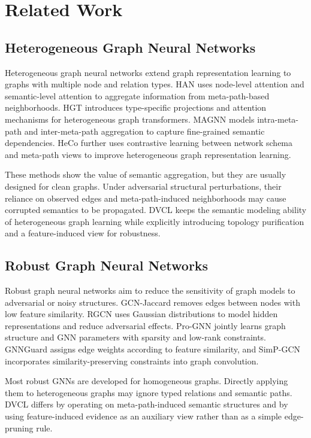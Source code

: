 ﻿\section{Related Work}

\subsection{Heterogeneous Graph Neural Networks}

Heterogeneous graph neural networks extend graph representation learning to graphs with multiple node and relation types. HAN \cite{wang2019han} uses node-level attention and semantic-level attention to aggregate information from meta-path-based neighborhoods. HGT \cite{hu2020hgt} introduces type-specific projections and attention mechanisms for heterogeneous graph transformers. MAGNN \cite{fu2020magnn} models intra-meta-path and inter-meta-path aggregation to capture fine-grained semantic dependencies. HeCo \cite{wang2021heco} further uses contrastive learning between network schema and meta-path views to improve heterogeneous graph representation learning.

These methods show the value of semantic aggregation, but they are usually designed for clean graphs. Under adversarial structural perturbations, their reliance on observed edges and meta-path-induced neighborhoods may cause corrupted semantics to be propagated. DVCL keeps the semantic modeling ability of heterogeneous graph learning while explicitly introducing topology purification and a feature-induced view for robustness.

\subsection{Robust Graph Neural Networks}

Robust graph neural networks aim to reduce the sensitivity of graph models to adversarial or noisy structures. GCN-Jaccard \cite{wu2019gcnjaccard} removes edges between nodes with low feature similarity. RGCN \cite{zhu2019rgcn} uses Gaussian distributions to model hidden representations and reduce adversarial effects. Pro-GNN \cite{jin2020prognn} jointly learns graph structure and GNN parameters with sparsity and low-rank constraints. GNNGuard \cite{zhang2020gnnguard} assigns edge weights according to feature similarity, and SimP-GCN \cite{jin2021simpgcn} incorporates similarity-preserving constraints into graph convolution.

Most robust GNNs are developed for homogeneous graphs. Directly applying them to heterogeneous graphs may ignore typed relations and semantic paths. DVCL differs by operating on meta-path-induced semantic structures and by using feature-induced evidence as an auxiliary view rather than as a simple edge-pruning rule.


